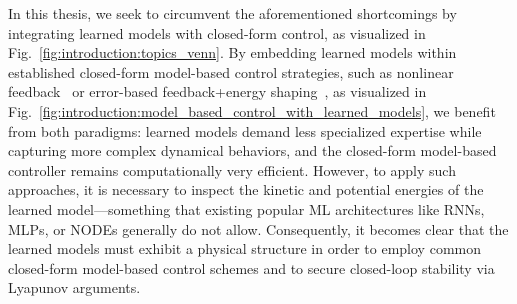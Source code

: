 In this thesis, we seek to circumvent the aforementioned shortcomings by integrating learned models with closed-form control, as visualized in Fig.~\ref{fig:introduction:topics_venn}. By embedding learned models within established closed-form model-based control strategies, such as nonlinear feedback~\citep{della2020model} or error-based feedback+energy shaping~\citep{della2023model, caasenbrood2023control}, as visualized in Fig.~\ref{fig:introduction:model_based_control_with_learned_models}, we benefit from both paradigms: learned models demand less specialized expertise while capturing more complex dynamical behaviors, and the closed-form model-based controller remains computationally very efficient. However, to apply such approaches, it is necessary to inspect the kinetic and potential energies of the learned model—something that existing popular \gls{ML} architectures like \glspl{RNN}, \glspl{MLP}, or \glspl{NODE} generally do not allow. Consequently, it becomes clear that the learned models must exhibit a physical structure in order to employ common closed-form model-based control schemes and to secure closed-loop stability via Lyapunov arguments.

